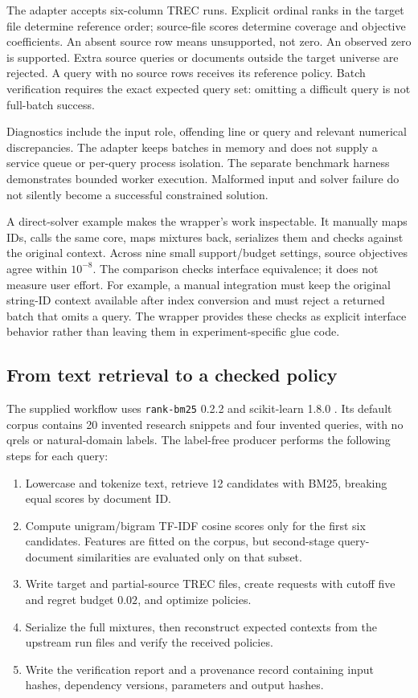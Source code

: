 \documentclass[runningheads]{llncs}
\begin{document}
The adapter accepts six-column TREC runs. Explicit ordinal ranks in the target
file determine reference order; source-file scores determine coverage and
objective coefficients. An absent source row means unsupported, not zero.
An observed zero is supported. Extra source queries or documents outside the
target universe are rejected. A query with no source rows receives its
reference policy. Batch verification requires the exact expected query set:
omitting a difficult query is not full-batch success.

Diagnostics include the input role, offending line or query and relevant
numerical discrepancies. The adapter keeps batches in memory and does not
supply a service queue or per-query process isolation. The separate benchmark
harness demonstrates bounded worker execution. Malformed input and solver
failure do not silently become a successful constrained solution.

A direct-solver example makes the wrapper's work inspectable. It manually maps
IDs, calls the same core, maps mixtures back, serializes them and checks against
the original context. Across nine small support/budget settings, source
objectives agree within $10^{-8}$. The comparison checks interface equivalence;
it does not measure user effort. For example, a manual integration must keep
the original string-ID context available after index conversion and must
reject a returned batch that omits a query. The wrapper provides these checks
as explicit interface behavior rather than leaving them in experiment-specific
glue code.

\subsection{From text retrieval to a checked policy}
The supplied workflow uses \texttt{rank-bm25} 0.2.2 and scikit-learn 1.8.0
\cite{rankbm25,sklearn}. Its default corpus contains 20 invented research
snippets and four invented queries, with no qrels or natural-domain labels.
The label-free producer performs the following steps for each query:
\begin{enumerate}
\item Lowercase and tokenize text, retrieve 12 candidates with BM25, breaking
equal scores by document ID.
\item Compute unigram/bigram TF-IDF cosine scores only for the first six
candidates. Features are fitted on the corpus, but second-stage query-document
similarities are evaluated only on that subset.
\item Write target and partial-source TREC files, create requests with cutoff
five and regret budget $0.02$, and optimize policies.
\item Serialize the full mixtures, then reconstruct expected contexts from
the upstream run files and verify the received policies.
\item Write the verification report and a provenance record containing input
hashes, dependency versions, parameters and output hashes.
\end{enumerate}
\end{document}
